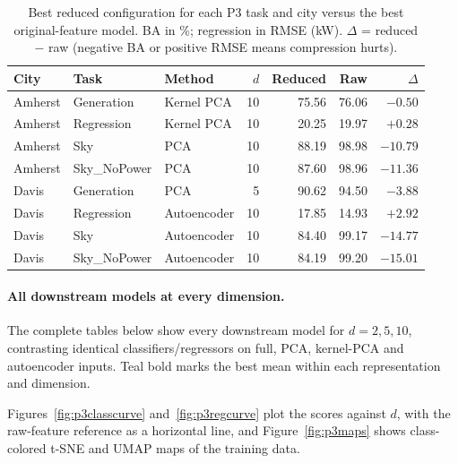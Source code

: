 \documentclass[11pt,letterpaper]{article}
\begin{document}
\begin{table}[!htbp]\centering\small
\caption{Best reduced configuration for each P3 task and city versus the best original-feature model. BA in \%; regression in RMSE (kW). $\Delta$ = reduced $-$ raw (negative BA or positive RMSE means compression hurts).}
\label{tab:p3}
\begin{tabular}{lllrrrr}\toprule
City & Task & Method & $d$ & Reduced & Raw & $\Delta$\\\midrule
Amherst & Generation & Kernel PCA & 10 & 75.56 & 76.06 & $-0.50$\\
Amherst & Regression & Kernel PCA & 10 & 20.25 & 19.97 & $+0.28$\\
Amherst & Sky & PCA & 10 & 88.19 & 98.98 & $-10.79$\\
Amherst & Sky\_NoPower & PCA & 10 & 87.60 & 98.96 & $-11.36$\\
Davis & Generation & PCA & 5 & 90.62 & 94.50 & $-3.88$\\
Davis & Regression & Autoencoder & 10 & 17.85 & 14.93 & $+2.92$\\
Davis & Sky & Autoencoder & 10 & 84.40 & 99.17 & $-14.77$\\
Davis & Sky\_NoPower & Autoencoder & 10 & 84.19 & 99.20 & $-15.01$\\
\bottomrule\end{tabular}
\end{table}

\paragraph{All downstream models at every dimension.}
The complete tables below show every downstream model for $d=2,5,10$, contrasting identical
classifiers/regressors on full, PCA, kernel-PCA and autoencoder inputs. Teal bold marks the best
mean within each representation and dimension.


Figures~\ref{fig:p3classcurve} and~\ref{fig:p3regcurve} plot the scores against $d$, with the
raw-feature reference as a horizontal line, and Figure~\ref{fig:p3maps} shows class-colored t-SNE
and UMAP maps of the training data.
\end{document}
